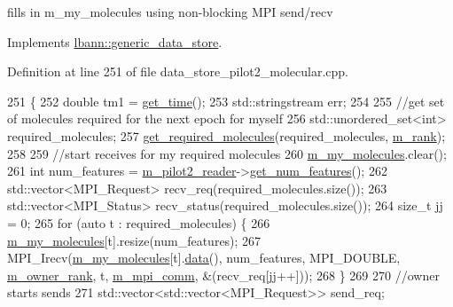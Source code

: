 fills in m\+\_\+my\+\_\+molecules using non-\/blocking M\+PI send/recv 



Implements \hyperlink{classlbann_1_1generic__data__store_a5a34663fbbc3714d45743a6ca7195f51}{lbann\+::generic\+\_\+data\+\_\+store}.



Definition at line 251 of file data\+\_\+store\+\_\+pilot2\+\_\+molecular.\+cpp.


\begin{DoxyCode}
251                                                 \{
252   \textcolor{keywordtype}{double} tm1 = \hyperlink{namespacelbann_a478d36031ff0659893c4322cd856157f}{get\_time}();
253   std::stringstream err;
254 
255   \textcolor{comment}{//get set of molecules required for the next epoch for myself}
256   std::unordered\_set<int> required\_molecules;
257   \hyperlink{classlbann_1_1data__store__pilot2__molecular_a7eadb63f1c879c62b587a7b5d972d4e4}{get\_required\_molecules}(required\_molecules, \hyperlink{classlbann_1_1generic__data__store_a87695bfd2d1ed0dbe01d99108e3f68b7}{m\_rank});
258 
259   \textcolor{comment}{//start receives for my required molecules}
260   \hyperlink{classlbann_1_1data__store__pilot2__molecular_a67fb9174cecff931f61e7f6ca000315b}{m\_my\_molecules}.clear();
261   \textcolor{keywordtype}{int} num\_features = \hyperlink{classlbann_1_1data__store__pilot2__molecular_a1875ae12fe7c2b11818ddb3fecff9f72}{m\_pilot2\_reader}->\hyperlink{classlbann_1_1pilot2__molecular__reader_ad4fcb0da3f6964cbe24de4feac3f5f4a}{get\_num\_features}();
262   std::vector<MPI\_Request> recv\_req(required\_molecules.size());
263   std::vector<MPI\_Status> recv\_status(required\_molecules.size());
264   \textcolor{keywordtype}{size\_t} jj = 0;
265   \textcolor{keywordflow}{for} (\textcolor{keyword}{auto} t : required\_molecules) \{
266     \hyperlink{classlbann_1_1data__store__pilot2__molecular_a67fb9174cecff931f61e7f6ca000315b}{m\_my\_molecules}[t].resize(num\_features);
267     MPI\_Irecv(\hyperlink{classlbann_1_1data__store__pilot2__molecular_a67fb9174cecff931f61e7f6ca000315b}{m\_my\_molecules}[t].\hyperlink{namespacelbann_1_1cnpy__utils_a9ac86d96ccb1f8b4b2ea16441738781f}{data}(), num\_features, MPI\_DOUBLE, 
      \hyperlink{classlbann_1_1data__store__pilot2__molecular_ad0c7ed6c6858d9958f73000b0b3137ac}{m\_owner\_rank}, t, \hyperlink{classlbann_1_1generic__data__store_ae2d2d61d5d766a7f525eedcb05e0dbf6}{m\_mpi\_comm}, &(recv\_req[jj++]));
268   \}
269 
270   \textcolor{comment}{//owner starts sends}
271   std::vector<std::vector<MPI\_Request>> send\_req;

\end{DoxyCode}
